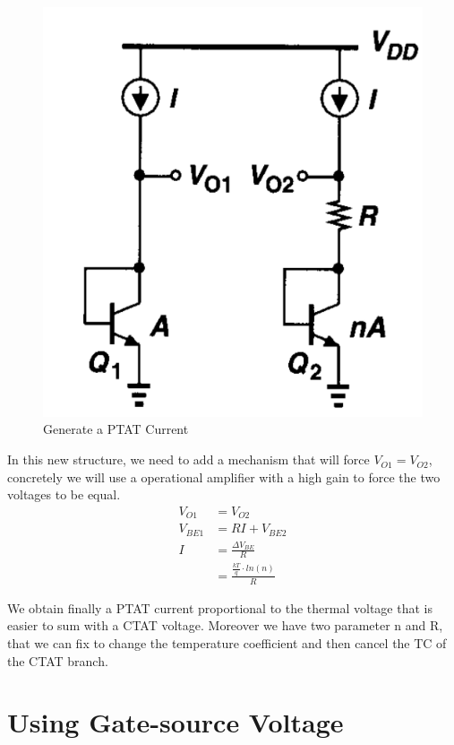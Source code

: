 \documentclass[11pt,a4paper]{report}
\begin{document}
\begin{figure}[h]
  \begin{center}
    \includegraphics[scale=0.35]{photo/PTAT2}
  \end{center}
  \caption{Generate a PTAT Current}
  \label{PTAT_Cur}
\end{figure}

In this new structure, we need to add a mechanism that will force $V_{O1} = V_{O2}$, concretely we will use a operational amplifier with a high gain to force the two voltages to be equal.
\begin{align}
  V_{O1} & = V_{O2} \\
  V_{BE1}& = RI + V_{BE2} \\
  I      & = \frac{\Delta V_{BE}}{R} \\
         & = \frac{\frac{kT}{q}\cdot ln(n)}{R}
\end{align}

We obtain finally a PTAT current proportional to the thermal voltage that is easier to sum with a CTAT voltage. Moreover we have two parameter n and R, that we can fix to change the temperature coefficient and then cancel the TC of the CTAT branch.

\section{Using Gate-source Voltage}
\end{document}
